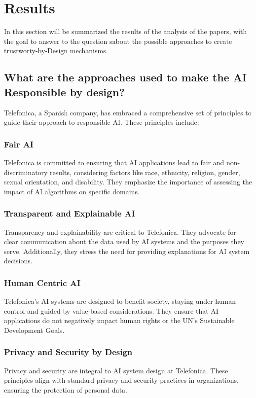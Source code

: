 \documentclass{article}
\begin{document}
\newpage
\section{Results}
In this section will be summarized the results of the analysis of the papers, with the goal to answer to the question sabout the possible approaches to create trustworty-by-Design mechanisms.

\subsection{What are the approaches used to make the AI Responsible by design?}
Telefonica, a Spanish company, has embraced a comprehensive set of principles to guide their approach to responsible AI. These principles include:

\subsubsection{Fair AI}
Telefonica is committed to ensuring that AI applications lead to fair and non-discriminatory results, considering factors like race, ethnicity, religion, gender, sexual orientation, and disability. They emphasize the importance of assessing the impact of AI algorithms on specific domains.

\subsubsection{Transparent and Explainable AI}
Transparency and explainability are critical to Telefonica. They advocate for clear communication about the data used by AI systems and the purposes they serve. Additionally, they stress the need for providing explanations for AI system decisions.

\subsubsection{Human Centric AI}
Telefonica's AI systems are designed to benefit society, staying under human control and guided by value-based considerations. They ensure that AI applications do not negatively impact human rights or the UN's Sustainable Development Goals.

\subsubsection{Privacy and Security by Design}
Privacy and security are integral to AI system design at Telefonica. These principles align with standard privacy and security practices in organizations, ensuring the protection of personal data.
\end{document}
